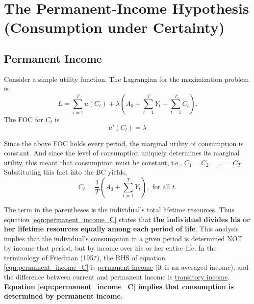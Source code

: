 \documentclass[10pt]{article}
\title{}
\author{}
\date{}
\begin{document}

\tableofcontents
\newpage


\section{The Permanent-Income Hypothesis (Consumption under Certainty)}


\subsection{Permanent Income}

Consider a simple utility function.
The Lagrangian for the maximization problem is
\begin{equation}
L = \sum\limits_{i = 1} ^T u(C_{t}) + \lambda
\left( 
		A_0 + \sum\limits_{t = 1} ^T Y_{t} - \sum\limits_{t = 1} ^T C_{t}		
\right) .
\end{equation}
The FOC for $ C_{t} $ is 
\begin{equation*}
u'(C_{t}) = \lambda
\end{equation*}

Since the above FOC holds every period, the marginal utility of consumption is constant.
And since the level of consumption uniquely determines its marginal utility, this meant that
consumption must be constant, i.e., $ C_1 = C_2 = ... = C_{T} $.
Substituting this fact into the BC yields,
\begin{equation}
C_{t} = \frac{1}{T}
\left( 
		A_0 + \sum\limits_{t = 1} ^T Y_{t}	
\right) , \text{ for all } t. \label{eqn:permanent_income_C}
\end{equation}

The term in the parentheses is the individual's total lifetime resources. 
Thus equation \eqref{eqn:permanent_income_C} states that 
{\textbf {the individual divides his or her lifetime resources equally among each period of life}}.
This analysis implies that the individual's consumption in a given period is determined
{\underline {NOT}} by income that period, but by income over his or her entire life.
In the terminology of Friedman (1957), the RHS of equation \eqref{eqn:permanent_income_C} is
{\underline {permanent income}} (it is an averaged income), and the difference between current
and permanent income is {\underline {transitory income}}.
{\textbf {
Equation \eqref{eqn:permanent_income_C} implies that consumption is determined by permanent income.
}}
\end{document}
